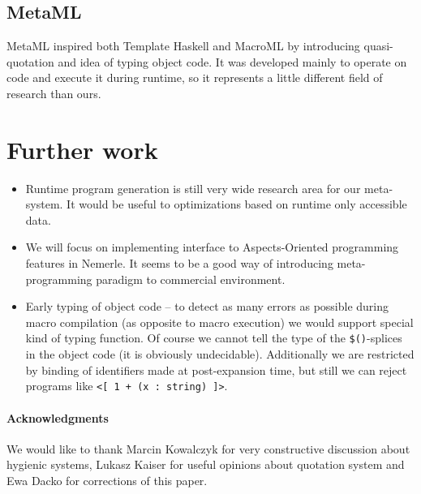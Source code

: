 \documentclass{llncs}
\begin{document}
\subsection{MetaML}
MetaML \cite{MetaML} inspired both Template Haskell and MacroML by introducing 
quasi-quotation and idea of typing object code. It was developed mainly to operate 
on code and execute it during runtime, so it represents a little different field of 
research than ours.

\section{Further work}
\begin{itemize}
\item Runtime program generation is still very wide research area for our meta-system.
  It would be useful to optimizations based on runtime only accessible data.
\item We will focus on implementing interface to Aspects-Oriented programming features
  in Nemerle. It seems to be a good way of introducing meta-program\-ming paradigm to 
  commercial environment.
\item Early typing of object code --
  to detect as many errors as possible during macro compilation (as opposite to
  macro execution) we would support special kind of typing function.
  Of course we cannot tell the type of the \verb,$(),-splices in the object   %
  code (it is obviously undecidable). Additionally we are restricted by binding
  of identifiers made at post-expansion time, but still we can reject programs like
  \verb,<[ 1 + (x : string) ]>,.
\end{itemize}

\paragraph{Acknowledgments}
We would like to thank Marcin Kowalczyk for very constructive discussion about hygienic
systems, Lukasz Kaiser for useful opinions about quotation system and Ewa Dacko for
corrections of this paper.
\end{document}
